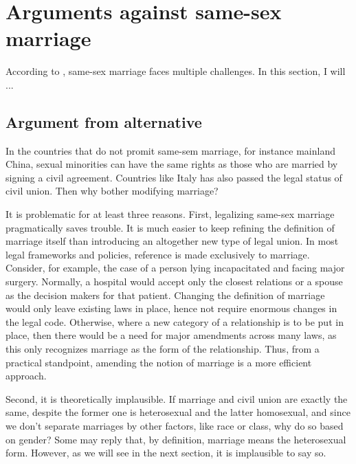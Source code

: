 \documentclass{article}
\begin{document}
\section{Arguments against same-sex marriage}

According to \textcite{brakeMarriageDomesticPartnership2023}, same-sex marriage faces multiple challenges. In this section, I will ...

\subsection{Argument from alternative}
\label{alternative}

In the countries that do not promit same-sem marriage, for instance mainland China, sexual minorities can have the same rights as those who are married by signing a civil agreement. Countries like Italy has also passed the legal status of civil union.\autocite{povoledoItalyApprovesSameSex2016} Then why bother modifying marriage? 

It is problematic for at least three reasons. First, legalizing same-sex marriage pragmatically saves trouble. It is much easier to keep refining the definition of marriage itself than introducing an altogether new type of legal union. In most legal frameworks and policies, reference is made exclusively to marriage. Consider, for example, the case of a person lying incapacitated and facing major surgery. Normally, a hospital would accept only the closest relations or a spouse as the decision makers for that patient. Changing the definition of marriage would only leave existing laws in place, hence not require enormous changes in the legal code. Otherwise, where a new category of a relationship is to be put in place, then there would be a need for major amendments across many laws, as this only recognizes marriage as the form of the relationship. Thus, from a practical standpoint, amending the notion of marriage is a more efficient approach. 

Second, it is theoretically implausible. If marriage and civil union are exactly the same, despite the former one is heterosexual and the latter homosexual, and since we don't separate marriages by other factors, like race or class, why do so based on gender? Some may reply that, by definition, marriage means the heterosexual form. However, as we will see in the next section, it is implausible to say so. 
\end{document}
